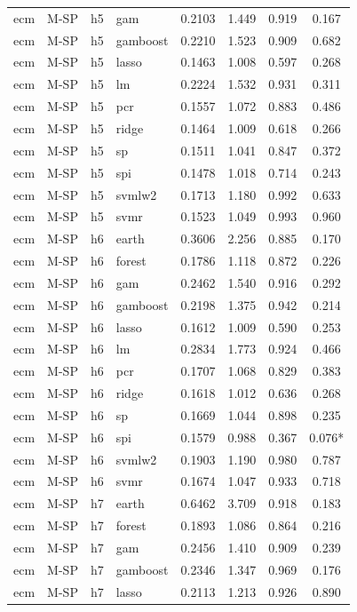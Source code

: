 \begin{ThreePartTable}
\begin{longtable}[t]{llclcccc}
ecm & M-SP & h5 & gam & 0.2103 & 1.449 & 0.919 & 0.167\\
ecm & M-SP & h5 & gamboost & 0.2210 & 1.523 & 0.909 & 0.682\\
ecm & M-SP & h5 & lasso & 0.1463 & 1.008 & 0.597 & 0.268\\
ecm & M-SP & h5 & lm & 0.2224 & 1.532 & 0.931 & 0.311\\
ecm & M-SP & h5 & pcr & 0.1557 & 1.072 & 0.883 & 0.486\\
ecm & M-SP & h5 & ridge & 0.1464 & 1.009 & 0.618 & 0.266\\
ecm & M-SP & h5 & sp & 0.1511 & 1.041 & 0.847 & 0.372\\
ecm & M-SP & h5 & spi & 0.1478 & 1.018 & 0.714 & 0.243\\
ecm & M-SP & h5 & svmlw2 & 0.1713 & 1.180 & 0.992 & 0.633\\
ecm & M-SP & h5 & svmr & 0.1523 & 1.049 & 0.993 & 0.960\\
\addlinespace
ecm & M-SP & h6 & earth & 0.3606 & 2.256 & 0.885 & 0.170\\
ecm & M-SP & h6 & forest & 0.1786 & 1.118 & 0.872 & 0.226\\
ecm & M-SP & h6 & gam & 0.2462 & 1.540 & 0.916 & 0.292\\
ecm & M-SP & h6 & gamboost & 0.2198 & 1.375 & 0.942 & 0.214\\
ecm & M-SP & h6 & lasso & 0.1612 & 1.009 & 0.590 & 0.253\\
ecm & M-SP & h6 & lm & 0.2834 & 1.773 & 0.924 & 0.466\\
ecm & M-SP & h6 & pcr & 0.1707 & 1.068 & 0.829 & 0.383\\
ecm & M-SP & h6 & ridge & 0.1618 & 1.012 & 0.636 & 0.268\\
ecm & M-SP & h6 & sp & 0.1669 & 1.044 & 0.898 & 0.235\\
ecm & M-SP & h6 & spi & 0.1579 & 0.988 & 0.367 & 0.076*\\
ecm & M-SP & h6 & svmlw2 & 0.1903 & 1.190 & 0.980 & 0.787\\
ecm & M-SP & h6 & svmr & 0.1674 & 1.047 & 0.933 & 0.718\\
\addlinespace
ecm & M-SP & h7 & earth & 0.6462 & 3.709 & 0.918 & 0.183\\
ecm & M-SP & h7 & forest & 0.1893 & 1.086 & 0.864 & 0.216\\
ecm & M-SP & h7 & gam & 0.2456 & 1.410 & 0.909 & 0.239\\
ecm & M-SP & h7 & gamboost & 0.2346 & 1.347 & 0.969 & 0.176\\
ecm & M-SP & h7 & lasso & 0.2113 & 1.213 & 0.926 & 0.890\\

\end{longtable}
\end{ThreePartTable}
